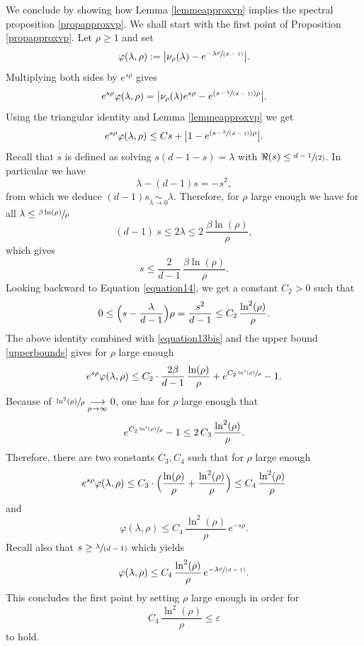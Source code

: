 \documentclass[10pt]{amsart}
\let\epsilon\varepsilon
\newcommand{\spfrac}[2]{\sfrac{#1}{(#2)}}
\theoremstyle{plain}
\theoremstyle{definition}
\newcommand{\tends}[1]{\underset{#1}{\longrightarrow}}
\newcommand{\equivaut}[1]{\underset{#1}{\sim}}
\begin{document}
We conclude by showing how Lemma \ref{lemmeapproxvp} implies the spectral proposition \ref{propapproxvp}. We shall start with the first point of Proposition \ref{propapproxvp}. Let $\rho \ge 1$ and set
\[
\varphi(\lambda,\rho) := \bigl| \nu_{\rho}(\lambda) - e^{-\lambda \spfrac{\rho}{d-1}}\bigr|.
\]
Multiplying both sides by $e^{s \rho}$ gives
\[
e^{s \rho} \varphi(\lambda,\rho) = \bigl| \nu_{\rho}(\lambda)e^{s\rho} - e^{\left(s - \spfrac{\lambda}{d-1} \right) \rho}\bigr|.
\]
Using the triangular identity and Lemma \ref{lemmeapproxvp} we get
\begin{equation}
\label{equation13bis}
e^{s \rho} \varphi(\lambda,\rho) \le C s + \bigl| 1 - e^{\left(s - \spfrac{\lambda}{d-1} \right) \rho} \bigr|.
\end{equation}
Recall that $s$ is defined as solving $s(d-1 -s) = \lambda$ with $\Re(s) \le \spfrac{d-1}{2}$. In particular we have
\begin{equation}
\label{equation14}
\lambda - (d-1)s = -s^2,
\end{equation}
from which we deduce $(d-1)s \equivaut{\lambda \to 0} \lambda$. Therefore, for $\rho$ large enough we have for all $\lambda \le \sfrac{\beta \ln(\rho) }{\rho}$
\[
(d-1) \ s \le 2 \lambda \le 2 \ \frac{\beta \ln (\rho)}{\rho},
\]
which gives
\begin{equation}
\label{upperbounds}
s \le \frac{2}{d-1}\, \frac{\beta \ln(\rho)}{\rho}.
\end{equation}
Looking backward to Equation \eqref{equation14}, we get a constant $C_2 > 0$ such that
\begin{equation*}
0 \le \Bigl(s - \frac{\lambda}{d-1} \Bigr) \rho = \frac{s^2}{d-1} \le C_2\, \frac{ \ln^2(\rho)}{\rho}.
\end{equation*}
The above identity combined with \eqref{equation13bis} and the upper bound \eqref{upperbounds} gives for $\rho$ large enough
\[
e^{s \rho} \varphi(\lambda,\rho) \le C_2 \cdot \frac{2 \beta}{d-1}\, \frac{\ln(\rho)}{\rho} + e^{ C_2 \sfrac{ \ln^2(\rho)}{\rho}} -1.
\]
Because of $\sfrac{\ln^2(\rho)}{\rho} \tends{\rho \to \infty} 0$, one has for $\rho$ large enough that
\[
e^{ C_2 \sfrac{ \ln^2(\rho)}{\rho}} -1 \le 2 \, C_3 \, \frac{\ln^2(\rho)}{\rho}.
\]
Therefore, there are two constants $C_3, C_4$ such that for $\rho$ large enough
\[
e^{s \rho} \varphi(\lambda,\rho) \le C_3 \cdot \Bigl(\frac{\ln(\rho)}{\rho} + \frac{ \ln^2(\rho)}{\rho} \Bigr) \le C_4\, \frac{ \ln^2(\rho)}{\rho}
\]
and
\[
\varphi(\lambda,\rho) \le C_4\, \frac{ \ln^2(\rho)}{\rho} \, e^{- s \rho}.
\]
Recall also that $ s \ge \spfrac{\lambda}{d-1}$ which yields
\[
\varphi(\lambda,\rho) \le C_4\, \frac{ \ln^2(\rho)}{\rho}\, e^{ - \lambda \spfrac{\rho}{d-1}}.
\]
This concludes the first point by setting $\rho$ large enough in order for
\[
C_4\, \frac{ \ln^2(\rho)}{\rho} \le \epsilon
\]
to hold.
\end{document}
